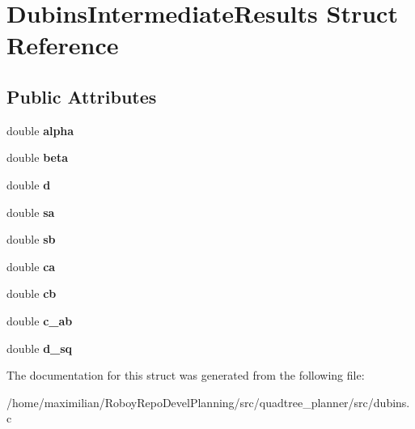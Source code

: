 \hypertarget{structDubinsIntermediateResults}{}\section{Dubins\+Intermediate\+Results Struct Reference}
\label{structDubinsIntermediateResults}
\subsection*{Public Attributes}
\begin{DoxyCompactItemize}
\item 
\mbox{\label{structDubinsIntermediateResults_a16dd90fd03de98085a5a2fe20462bdb7}} 
double {\bfseries alpha}
\item 
\mbox{\label{structDubinsIntermediateResults_a3cdf7760c671e13f89d39a9a7797bb27}} 
double {\bfseries beta}
\item 
\mbox{\label{structDubinsIntermediateResults_a2c7907bf15d843630ab3ac72c008dc29}} 
double {\bfseries d}
\item 
\mbox{\label{structDubinsIntermediateResults_a8f48ddc917c92cdc085e8307bb614c3c}} 
double {\bfseries sa}
\item 
\mbox{\label{structDubinsIntermediateResults_afaa830d0fac94e976b9c73617ef81c23}} 
double {\bfseries sb}
\item 
\mbox{\label{structDubinsIntermediateResults_ad90b052827792e3593993570f1af378f}} 
double {\bfseries ca}
\item 
\mbox{\label{structDubinsIntermediateResults_aa0b40e6890ad6ca9bb6b8393f1cdba29}} 
double {\bfseries cb}
\item 
\mbox{\label{structDubinsIntermediateResults_abbfbd766bb26dd03b571bce328032f92}} 
double {\bfseries c\+\_\+ab}
\item 
\mbox{\label{structDubinsIntermediateResults_aee0ab71f744ccb8551d3d409c2c38391}} 
double {\bfseries d\+\_\+sq}
\end{DoxyCompactItemize}


The documentation for this struct was generated from the following file\+:\begin{DoxyCompactItemize}
\item 
/home/maximilian/\+Roboy\+Repo\+Devel\+Planning/src/quadtree\+\_\+planner/src/dubins.\+c\end{DoxyCompactItemize}
